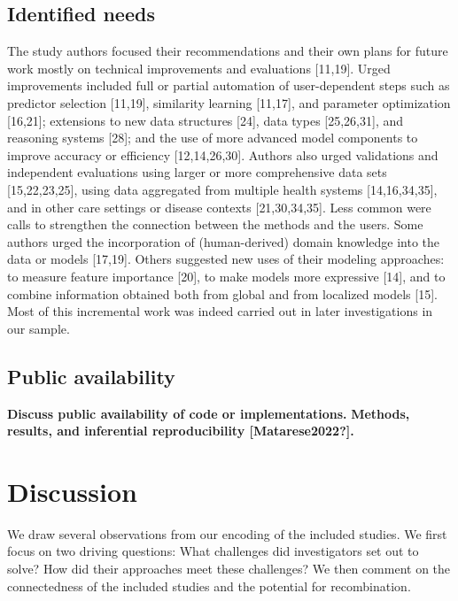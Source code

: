\documentclass[preprint, 3p,
authoryear]{elsarticle} %
\begin{document}
\hypertarget{identified-needs}{%
\subsection{Identified needs}\label{identified-needs}}

\label{sec:needs}

The study authors focused their recommendations and their own plans for
future work mostly on technical improvements and evaluations
{[}11,19{]}. Urged improvements included full or partial automation of
user-dependent steps such as predictor selection {[}11,19{]}, similarity
learning {[}11,17{]}, and parameter optimization {[}16,21{]}; extensions
to new data structures {[}24{]}, data types {[}25,26,31{]}, and
reasoning systems {[}28{]}; and the use of more advanced model
components to improve accuracy or efficiency {[}12,14,26,30{]}. Authors
also urged validations and independent evaluations using larger or more
comprehensive data sets {[}15,22,23,25{]}, using data aggregated from
multiple health systems {[}14,16,34,35{]}, and in other care settings or
disease contexts {[}21,30,34,35{]}. Less common were calls to strengthen
the connection between the methods and the users. Some authors urged the
incorporation of (human-derived) domain knowledge into the data or
models {[}17,19{]}. Others suggested new uses of their modeling
approaches: to measure feature importance {[}20{]}, to make models more
expressive {[}14{]}, and to combine information obtained both from
global and from localized models {[}15{]}. Most of this incremental work
was indeed carried out in later investigations in our sample.

\hypertarget{public-availability}{%
\subsection{Public availability}\label{public-availability}}

\label{sec:availability}

\textbf{Discuss public availability of code or implementations.}
\textbf{Methods, results, and inferential reproducibility
{[}\textbf{Matarese2022?}{]}.}

\hypertarget{discussion}{%
\section{Discussion}\label{discussion}}

We draw several observations from our encoding of the included studies.
We first focus on two driving questions: What challenges did
investigators set out to solve? How did their approaches meet these
challenges? We then comment on the connectedness of the included studies
and the potential for recombination.
\end{document}
